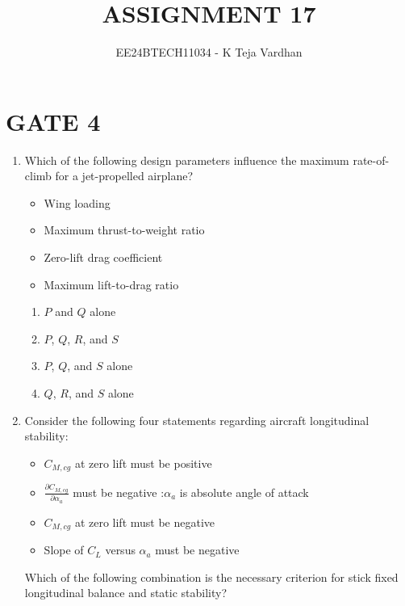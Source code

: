 \documentclass[journal]{IEEEtran}
\begin{document}

\title{ASSIGNMENT 17}
\author{EE24BTECH11034 - K Teja Vardhan}
{\let\newpage\relax\maketitle}

\section{GATE 4}
\begin{enumerate}



\item Which of the following design parameters influence the maximum rate-of-climb for a jet-propelled airplane?

\begin{itemize}
    \item Wing loading
    \item Maximum thrust-to-weight ratio
    \item Zero-lift drag coefficient
    \item Maximum lift-to-drag ratio
\end{itemize}

\begin{enumerate}
    \item $P$ and $Q$ alone
    \item $P$, $Q$, $R$, and $S$
    \item $P$, $Q$, and $S$ alone
    \item $Q$, $R$, and $S$ alone
\end{enumerate}

\item Consider the following four statements regarding aircraft longitudinal stability:

\begin{itemize}
    \item $C_{M,cg}$ at zero lift must be positive
    \item $\frac{\partial C_{M,cg}}{\partial \alpha_a}$ must be negative :$\alpha_a$ is absolute angle of attack
    \item $C_{M,cg}$ at zero lift must be negative
    \item Slope of $C_L$ versus $\alpha_a$ must be negative
\end{itemize}

Which of the following combination is the necessary criterion for stick fixed longitudinal balance and static stability?



\end{enumerate}
\end{document}
